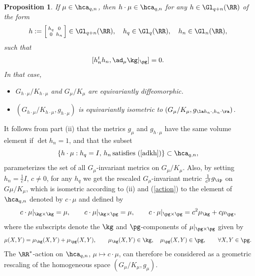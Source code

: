 \documentclass[11pt]{amsart}
\theoremstyle{plain}
\newtheorem{proposition}[theorem]{Proposition}
\theoremstyle{definition}
\theoremstyle{remark}
\begin{document}
\begin{proposition}\label{const}\cite{spacehm}
If $\mu\in\hca_{q,n}$, then $h\cdot\mu\in\hca_{q,n}$ for any $h\in\Gl_{q+n}(\RR)$ of the form
\begin{equation}\label{formh}
h:=\left[\begin{smallmatrix} h_q&0\\ 0&h_n
\end{smallmatrix}\right]\in\Gl_{q+n}(\RR), \quad h_q\in\Gl_q(\RR), \quad h_n\in\Gl_n(\RR),
\end{equation}
such that
\begin{equation}\label{adkh}
[h_n^th_n,\ad_{\mu}{\kg}|_{\pg}]=0.
\end{equation}
In that case,
\begin{itemize}
\item[(i)] $G_{h\cdot\mu}/K_{h\cdot\mu}$ and $G_{\mu}/K_{\mu}$ are equivariantly diffeomorphic.

\item[(ii)] $\left(G_{h\cdot\mu}/K_{h\cdot\mu},g_{h\cdot\mu}\right)$ is equivariantly isometric to $\left(G_{\mu}/K_{\mu},g_{\la h_n\cdot,h_n\cdot\ra}\right)$.
\end{itemize}
\end{proposition}

It follows from part (ii) that the metrics $g_\mu$ and $g_{h\cdot\mu}$ have the same volume element if $\det{h_n}=1$, and that the subset
$$
\left\{ h\cdot\mu:h_q=I,\, h_n\,\mbox{satisfies (\ref{adkh})}\right\}\subset\hca_{q,n},
$$
parameterizes the set of all $G_\mu$-invariant metrics on $G_\mu/K_\mu$.  Also, by setting $h_n=\frac{1}{c}I$, $c\ne 0$, for any $h_q$ we get the rescaled $G_\mu$-invariant metric $\frac{1}{c^2}g_{\ip}$ on $G\mu/K_\mu$, which is isometric according to (ii) and (\ref{action}) to the element of $\hca_{q,n}$ denoted by $c\cdot\mu$ and defined by
\begin{equation}\label{scmu}
c\cdot\mu|_{\kg\times\kg}=\mu, \qquad c\cdot\mu|_{\kg\times\pg}=\mu, \qquad c\cdot\mu|_{\pg\times\pg}=c^2\mu_{\kg}+c\mu_{\pg},
\end{equation}
where the subscripts denote the $\kg$ and $\pg$-components of $\mu|_{\pg\times\pg}$ given by
\begin{equation}\label{decmu}
\mu(X,Y)=\mu_{\kg}(X,Y)+\mu_{\pg}(X,Y), \qquad \mu_{\kg}(X,Y)\in\kg, \quad \mu_{\pg}(X,Y)\in\pg, \qquad\forall X,Y\in\pg.
\end{equation}
The $\RR^*$-action on $\hca_{q,n}$, $\mu\mapsto c\cdot\mu$, can therefore be considered as a geometric rescaling of the homogeneous space $(G_\mu/K_\mu,g_\mu)$.
\end{document}
